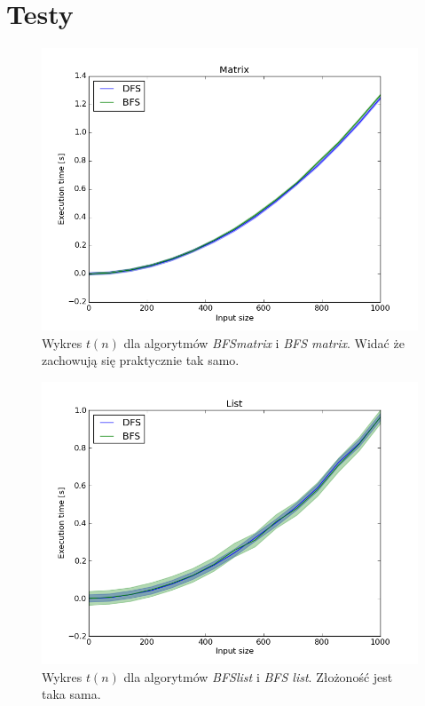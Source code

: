 \documentclass[12pt]{article}
\begin{document}
\section{Testy}
\begin{figure}[H]
\includegraphics[width=\textwidth,keepaspectratio=true]{matrix/matrix.png}
\caption{Wykres $t(n)$ dla algorytmów \emph{BFS\textunderscore matrix} i \emph{BFS \textunderscore matrix}. Widać że zachowują się praktycznie tak samo.}
\end{figure}
\begin{figure}[H]
\includegraphics[width=\textwidth,keepaspectratio=true]{matrix/list.png}
\caption{Wykres $t(n)$ dla algorytmów \emph{BFS\textunderscore list} i \emph{BFS \textunderscore list}. Złożoność jest taka sama.}
\end{figure}
\end{document}
